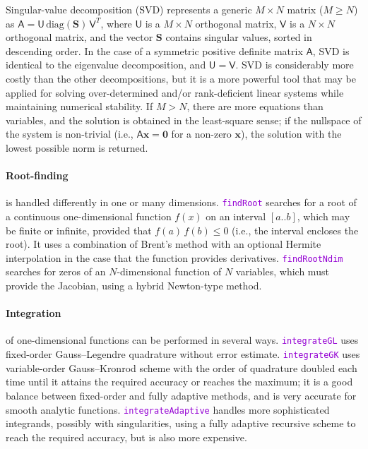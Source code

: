 \documentclass[12pt]{article}
\newcommand{\ttt}[1]{\textcolor{darkviolet}{\texttt{#1}}}
\newcommand{\bx}{\boldsymbol{x}}
\let\oldparagraph\paragraph
\renewcommand{\paragraph}[1]{\vspace{-2mm}\oldparagraph{#1}}
\begin{document}
Singular-value decomposition (SVD) represents a generic $M\times N$ matrix ($M\ge N$) as $\mathsf{A}=\mathsf{U}\,\mathrm{diag}(\boldsymbol{S})\,\mathsf{V}^T$, where $\mathsf{U}$ is a $M\times N$ orthogonal matrix, $\mathsf{V}$ is a $N\times N$ orthogonal matrix, and the vector $\boldsymbol{S}$ contains singular values, sorted in descending order. In the case of a symmetric positive definite matrix $\mathsf{A}$, SVD is identical to the eigenvalue decomposition, and $\mathsf{U}=\mathsf{V}$.
SVD is considerably more costly than the other decompositions, but it is a more powerful tool that may be applied for solving over-determined and/or rank-deficient linear systems while maintaining numerical stability.
If $M>N$, there are more equations than variables, and the solution is obtained in the least-square sense; if the nullspace of the system is non-trivial (i.e., $\mathsf{A}\bx=\boldsymbol{0}$ for a non-zero $\bx$), the solution with the lowest possible norm is returned.

\paragraph{Root-finding}  is handled differently in one or many dimensions.
\ttt{findRoot} searches for a root of a continuous one-dimensional function $f(x)$ on an interval $[a..b]$, which may be finite or infinite, provided that $f(a)\,f(b) \le 0$ (i.e., the interval encloses the root). It uses a combination of Brent's method with an optional Hermite interpolation in the case that the function provides derivatives.
\ttt{findRootNdim} searches for zeros of an $N$-dimensional function of $N$ variables, which must provide the Jacobian, using a hybrid Newton-type method.

\paragraph{Integration}  of one-dimensional functions can be performed in several ways. \ttt{integrateGL} uses fixed-order Gauss--Legendre quadrature without error estimate. \ttt{integrateGK} uses variable-order Gauss--Kronrod scheme with the order of quadrature doubled each time until it attains the required accuracy or reaches the maximum; it is a good balance between fixed-order and fully adaptive methods, and is very accurate for smooth analytic functions. \ttt{integrateAdaptive} handles more sophisticated integrands, possibly with singularities, using a fully adaptive recursive scheme to reach the required accuracy, but is also more expensive.
\end{document}
